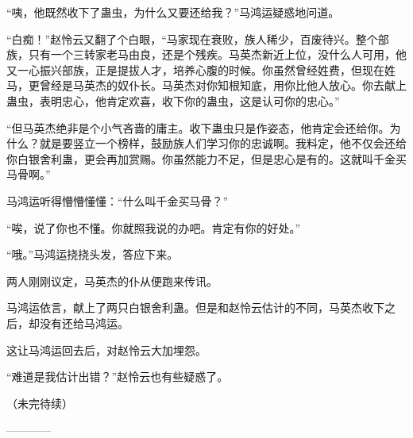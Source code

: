 \begin{this_body}
“咦，他既然收下了蛊虫，为什么又要还给我？”马鸿运疑惑地问道。

“白痴！”赵怜云又翻了个白眼，“马家现在衰败，族人稀少，百废待兴。整个部族，只有一个三转家老马由良，还是个残疾。马英杰新近上位，没什么人可用，他又一心振兴部族，正是提拔人才，培养心腹的时候。你虽然曾经姓费，但现在姓马，更曾经是马英杰的奴仆长。马英杰对你知根知底，用你比他人放心。你去献上蛊虫，表明忠心，他肯定欢喜，收下你的蛊虫，这是认可你的忠心。”

“但马英杰绝非是个小气吝啬的庸主。收下蛊虫只是作姿态，他肯定会还给你。为什么？就是要竖立一个榜样，鼓励族人们学习你的忠诚啊。我料定，他不仅会还给你白银舍利蛊，更会再加赏赐。你虽然能力不足，但是忠心是有的。这就叫千金买马骨啊。”

马鸿运听得懵懵懂懂：“什么叫千金买马骨？”

“唉，说了你也不懂。你就照我说的办吧。肯定有你的好处。”

“哦。”马鸿运挠挠头发，答应下来。

两人刚刚议定，马英杰的仆从便跑来传讯。

马鸿运依言，献上了两只白银舍利蛊。但是和赵怜云估计的不同，马英杰收下之后，却没有还给马鸿运。

这让马鸿运回去后，对赵怜云大加埋怨。

“难道是我估计出错？”赵怜云也有些疑惑了。

（未完待续）

------------

\end{this_body}

